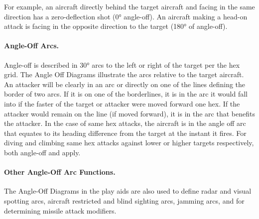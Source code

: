For example, an aircraft directly behind the target aircraft and facing in the same direction has a zero-deflection shot (0° angle-off). An aircraft making a head-on attack is facing in the opposite direction to the target (180° of angle-off).

\paragraph{Angle-Off Arcs.} Angle-off is described in 30° arcs to the left or right of the target per the hex grid. The Angle Off Diagrams illustrate the arcs relative to the target aircraft. An attacker will be clearly in an arc or directly on one of the lines defining the border of two arcs. If it is on one of the borderlines, it is in the arc it would fall into if the faster of the target or attacker were moved forward one hex.   If the attacker would remain on the line (if moved forward), it is in the arc that benefits the attacker. In the case of same hex attacks, the aircraft is in the angle off arc that equates to its heading difference from the target at the instant it fires.  For diving and climbing same hex attacks against lower or higher targets respectively, both angle-off and  apply.

\paragraph{Other Angle-Off Arc Functions.} The Angle-Off Diagrams in the play aids are also used to define radar and visual spotting arcs, aircraft restricted and blind sighting arcs, jamming arcs, and for determining missile attack modifiers.


